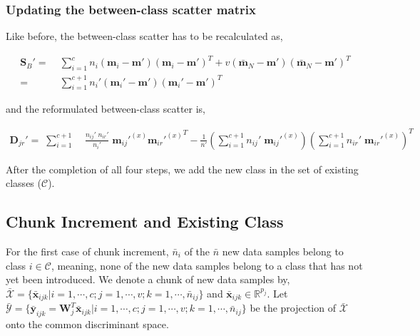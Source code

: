 \subsubsection{Updating the between-class scatter matrix}
\label{ssubs:MvIDA_SeqNC_Sb}
Like before, the between-class scatter has to be recalculated as,

\begin{equation}
\label{eqn:2Sb}
\begin{split}
\textbf{S}_B' = \; & \sum_{i=1}^{c} n_{i} (\textbf{m}_{i} - \textbf{m}') (\textbf{m}_{i} - \textbf{m}')^T + v(\bar{\textbf{m}}_N - \textbf{m}') (\bar{\textbf{m}}_N - \textbf{m}')^T\\
= \; & \sum_{i=1}^{c+1} n_{i}' (\textbf{m}_{i}' - \textbf{m}') (\textbf{m}_{i}' - \textbf{m}')^T \end{split}
\end{equation}

\noindent
and the reformulated between-class scatter is,

\begin{equation}
\label{eqn:2Djr}
\begin{split}
\textbf{D}_{jr}' = \; \sum_{i=1}^{c+1} & \; \frac{n_{ij}' \; n_{ir}'}{n_{i}'} \; {\textbf{m}_{ij}'}^{(x)} {{\textbf{m}_{ir}'}^{(x)}}^T - \frac{1}{n'} \left (\sum_{i=1}^{c+1} n_{ij}' \; {\textbf{m}_{ij}'}^{(x)} \right ) \left (\sum_{i=1}^{c+1} n_{ir}' \; {{\textbf{m}_{ir}'}^{(x)}} \right )^T
\end{split}
\end{equation}

\noindent
After the completion of all four steps, we add the new class in the set of existing classes ($\mathcal{C}$).








\subsection{Chunk Increment and Existing Class}
\label{subs:MvIDA_ChkEC}
For the first case of chunk increment, $\bar{n}_i$ of the $\bar{n}$ new data samples belong to class $i \in \mathcal{C}$, meaning, none of the new data samples belong to a class that has not yet been introduced. We denote a chunk of new data samples by, $\bar{\mathcal{X}} = \{ \bar{\textbf{x}}_{ijk} | i=1,\cdots,c; j=1,\cdots,v; k=1,\cdots,\bar{n}_{ij} \}$ and $\bar{\textbf{x}}_{ijk} \in \mathbb{R}^{p_j}$. Let $\bar{\mathcal{Y}} = \{ \bar{\textbf{y}}_{ijk} = \textbf{W}_j^T \bar{\textbf{x}}_{ijk} | i=1,\cdots,c; j=1,\cdots,v; k=1,\cdots,\bar{n}_{ij} \}$ be the projection of $\bar{\mathcal{X}}$ onto the common discriminant space.



